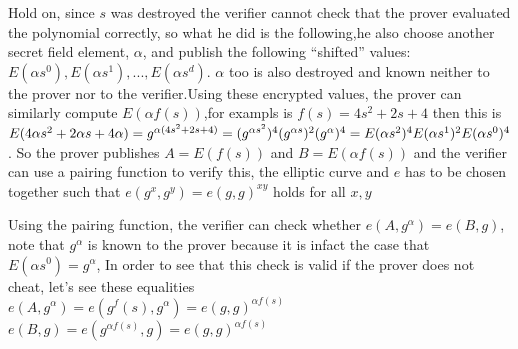 \documentclass[12pt,letterpaper]{article}
\begin{document}
Hold on, since $s$ was destroyed the verifier cannot check that the prover evaluated the polynomial correctly, so what he did is the following,he also choose another secret field element, $\alpha$, and publish the following “shifted” values:
$E(\alpha s^0), E(\alpha s^1), ..., E(\alpha s^d)$. $\alpha$ too is also destroyed and known neither to the prover nor to the verifier.Using these encrypted values, the prover can similarly compute $E(\alpha f(s))$,for exampls is $f(s)=4s^2+2s+4$ then this is\\
$E(4\alpha s^2 + 2\alpha s + 4\alpha)\\
=g^{\alpha(4s^2+2s+4)}= (g^{\alpha s^2})^4(g^{\alpha s})^2(g^\alpha)^4\\
= E(\alpha s^2)^4 E(\alpha s^1)^2 E(\alpha s^0)^4$. So the prover publishes $A=E(f(s))$ and $B=E(\alpha f(s))$ and the verifier can use a pairing function to verify this, the elliptic curve and $e$ has to be chosen together such that $e(g^x,g^y)=e(g,g)^{xy}$ holds for all $x,y$

Using the pairing function, the verifier can check whether $e(A,g^\alpha)=e(B,g)$, note that $g^\alpha$ is known to the prover because it is infact the case that $E(\alpha s^0)=g^\alpha$, In order to see that this check is valid if the prover does not cheat, let's see these equalities \\
$e(A,g^\alpha)=e(g^f(s),g^\alpha)=e(g,g)^{\alpha f(s)}$\\
$e(B,g)=e(g^{\alpha f(s)},g)=e(g,g)^{\alpha f(s)}$
\end{document}
